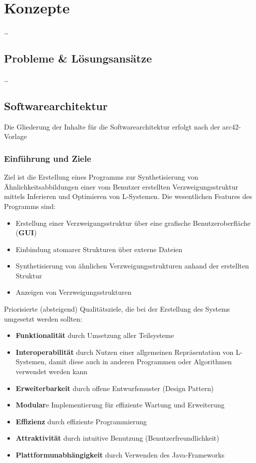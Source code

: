 
\chapter{Konzepte}
\ldots

\section{Probleme \& Lösungsansätze}
\ldots

\section{Softwarearchitektur}

Die Gliederung der Inhalte für die Softwarearchitektur erfolgt nach der arc42-Vorlage~\cite{arc42}

\subsection{Einführung und Ziele}
Ziel ist die Erstellung eines Programms zur Synthetisierung von Ähnlichkeitsabbildungen einer vom Benutzer
erstellten Verzweigungsstruktur mittels Inferieren und Optimieren von L-Systemen.
Die wesentlichen Features des Programms sind:
\begin{itemize}
    \item Erstellung einer Verzweigungsstruktur über eine grafische Benutzeroberfläche (\textbf{GUI})
    \item Einbindung atomarer Strukturen über externe Dateien
    \item Synthetisierung von ähnlichen Verzweigungsstrukturen anhand der erstellten Struktur
    \item Anzeigen von Verzweigungsstrukturen
\end{itemize}
Priorisierte (absteigend) Qualitätsziele, die bei der Erstellung des Systems umgesetzt werden sollten:
\begin{itemize}
    \item \textbf{Funktionalität} durch Umsetzung aller Teilsysteme
    \item \textbf{Interoperabilität} durch Nutzen einer allgemeinen Repräsentation von L-Systemen, damit diese
    auch in anderen Programmen oder Algorithmen verwendet werden kann
    \item \textbf{Erweiterbarkeit} durch offene Entwurfsmuster (Design Pattern)
    \item \textbf{Modular}e Implementierung für effiziente Wartung und Erweiterung
    \item \textbf{Effizienz} durch effiziente Programmierung
    \item \textbf{Attraktivität} durch intuitive Benutzung (Benutzerfreundlichkeit)
    \item \textbf{Plattformunabhängigkeit} durch Verwenden des Java-Frameworks
\end{itemize}

